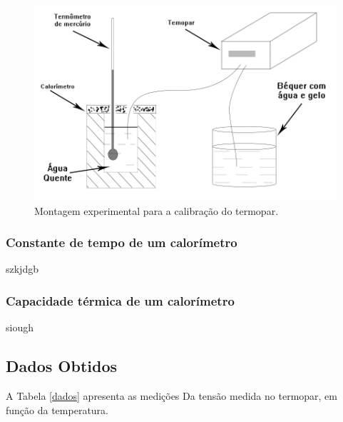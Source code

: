 \documentclass[12pt,a4paper]{article}
\begin{document}
\begin{figure}[!htbp]
\centering
\includegraphics[scale=0.3]{Fig6a2.jpg}
\caption{Montagem experimental para a calibração do termopar.}
\label{exptermopar}
\end{figure}


\subsubsection{Constante de tempo de um calorímetro}
szkjdgb

\subsubsection{Capacidade térmica de um calorímetro}
siough



\subsection{Dados Obtidos}

A Tabela \ref{dados} apresenta as medições Da tensão medida no termopar, em função da temperatura.
\end{document}
